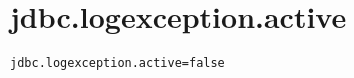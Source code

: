 \section{jdbc.logexception.active}
\label{configuration:JdbcLogexceptionActive}
\ClearAPI
\TODO
{}
\begin{lstlisting}[style=Props,caption={Usage example for \textit{jdbc.logexception.active}}]
jdbc.logexception.active=false
\end{lstlisting}